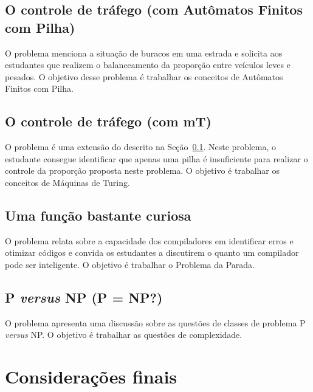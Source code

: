 \subsection{O controle de tráfego (com Autômatos
Finitos com Pilha)}
\label{problema3}
O problema menciona a situação de buracos em uma estrada e
solicita aos estudantes que realizem o balanceamento da proporção
entre veículos leves e pesados.
O objetivo desse problema é trabalhar os conceitos de Autômatos
Finitos com Pilha.

\subsection{O controle de tráfego (com mT)}
O problema é uma extensão do descrito na Seção~\ref{problema3}.
Neste problema, o estudante consegue identificar que apenas uma pilha
é insuficiente para realizar o controle da proporção proposta neste
problema.
O objetivo é trabalhar os conceitos de Máquinas de Turing.

\subsection{Uma função bastante curiosa}
O problema relata sobre a capacidade dos compiladores
em identificar erros e otimizar códigos e convida os
estudantes a discutirem o quanto um compilador
pode ser inteligente.
O objetivo é trabalhar o Problema da Parada.

\subsection{P \textit{versus} NP (P = NP?)}
O problema apresenta uma discussão sobre as questões
de classes de problema P \textit{versus} NP.
O objetivo é trabalhar as questões de complexidade.

\section{Considerações finais}
